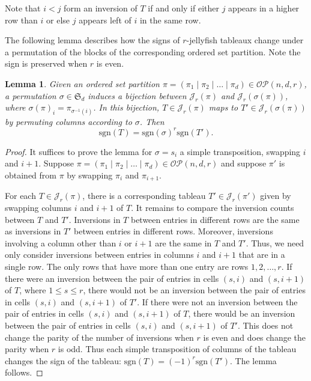 \documentclass[10pt]{amsart}
\theoremstyle{definition}
\theoremstyle{plain}
\newtheorem{lemma}[cdrthm]{Lemma}
\theoremstyle{plain}
\theoremstyle{definition}
\theoremstyle{remark}
\theoremstyle{plain}
\theoremstyle{plain}
\theoremstyle{plain}
\numberwithin{equation}{section}
\newcommand{\rstab}{\mathcal{J}}
\newcommand{\sgn}{\mathrm{sgn}}
\newcommand{\ordsetpart}{\mathcal{OP}}
\begin{document}
Note that $i < j$ form an inversion of $T$ if and only if either $j$ appears in a higher row than $i$ or else $j$ appears left of $i$ in the same row.

The following lemma describes how the signs of $r$-jellyfish tableaux change under a permutation of the blocks of the corresponding ordered set partition. Note the sign is preserved when $r$ is even.

\begin{lemma}\label{lem:colswap}
Given an ordered set partition $\pi=(\pi_1\mid \pi_2\mid \ldots\mid \pi_d)\in\ordsetpart(n,d,r)$, a permutation $\sigma\in \mathfrak{S}_d$ induces a bijection between $\rstab_r(\pi)$ and $\rstab_r(\sigma(\pi))$, where $\sigma(\pi)_i = \pi_{\sigma^{-1}(i)}$. In this bijection,
$T\in\rstab_r(\pi)$ maps to $T'\in\rstab_r(\sigma(\pi))$ by permuting columns according to $\sigma$. Then \[\sgn(T)=\sgn(\sigma)^r\sgn(T').\]
\end{lemma}
\begin{proof}
It suffices to prove the lemma for $\sigma = s_i$ a simple transposition, swapping $i$ and $i+1$.
Suppose $\pi=(\pi_1\mid \pi_2\mid \ldots\mid \pi_d)\in\ordsetpart(n,d,r)$ and suppose $\pi'$ is obtained from $\pi$ by swapping $\pi_i$ and $\pi_{i+1}$. 

For each $T\in\rstab_r(\pi)$, there is a corresponding tableau $T'\in\rstab_r(\pi')$ given by swapping columns $i$ and $i+1$ of $T$. It remains to compare the inversion counts between $T$ and $T'$. Inversions in $T$ between entries in different rows are the same as inversions in $T'$ between entries in different rows. 
Moreover, inversions involving a column other than $i$ or $i+1$ are the same in $T$ and $T'$.
Thus, we need only consider inversions between entries in columns $i$ and $i+1$ that are in a single row. The only rows that have more than one entry are rows $1,2,\ldots,r$. If there were an inversion between the pair of entries in cells $(s,i)$ and $(s,i+1)$ of $T$,  where $1\leq s \leq r$, there would not be an inversion between the pair of entries in cells $(s,i)$ and $(s,i+1)$ of $T'$. If there were not an inversion between the pair of entries in cells $(s,i)$ and $(s,i+1)$ of $T$, there would be an inversion between the pair of entries in cells $(s,i)$ and $(s,i+1)$ of $T'$. This does not change the parity of the number of inversions when $r$ is even and does change the parity when $r$ is odd. Thus each simple transposition of columns of the tableau changes the sign of the tableau: ${\sgn(T)}=(-1)^r{\sgn(T')}$. The lemma follows.
\end{proof}
\end{document}
